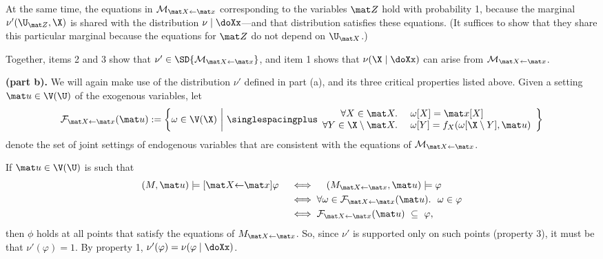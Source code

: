 \begin{subappendices}
\begin{lproof}
\begin{enumerate}
        At the same time, the equations in $\mathcal M_{\mat X{\gets} \mat x}$ corresponding to the variables $\mat Z$ hold with probability 1, because the marginal $\nu'(\U_{\mat Z}, \X)$ is shared with the distribution $\nu \mid \doXx$---and that distribution satisfies these equations. (It suffices to show that they share this particular marginal because the equations for $\mat Z$ do not depend on $\U_{\mat X}$.)
    \end{enumerate}
    Together, items 2 and 3 show that $\nu' \in \SD{\mathcal M_{\mat X{\gets} \mat x}}$, and item 1 shows that $\nu(\X \mid \doXx)$ can arise from $\mathcal M_{\mat X{\gets} \mat x}$. 


    \bigskip

    \textbf{(part b).}
    We will again make use of the distribution $\nu'$ defined in part (a), and its three critical properties listed above. 
    Given a setting $\mat u \in \V(\U)$ of the exogenous variables, let
    \[
        \mathcal F_{\mat X \gets \mat x} (\mat u) 
        := \left\{ \omega \in \V(\X) ~\middle|~
        {\singlespacingplus\begin{array}{rl}
            \forall X \in \mat X.~& \omega[X] = \mat x[X]\\
            \forall Y \in \X \setminus \mat X.~&\omega[Y] = f_X(\omega[\X \setminus Y], \mat u) 
        \end{array}}
        \right\} 
    \]
    denote the set of joint settings of endogenous variables that are consistent with the equations of $\mathcal M_{\mat X \gets \mat x}$. 

    If $\mat u \in \V(\U)$ is such that 
    \begin{align*}
        (M, \mat u) \models [\mat X {\gets} \mat x] \varphi
        \quad&\iff\quad
        (M_{\mat X {\gets} \mat x}, \mat u) \models \varphi  \\
        &\iff \forall \omega \in \mathcal F_{\mat X {\gets} \mat x}(\mat u).~~\omega \in \varphi \\
        &\iff 
            \mathcal F_{\mat X {\gets} \mat x}(\mat u)
                ~\subseteq~ \varphi, 
    \end{align*}
    then $\phi$ holds at all points that satisfy the equations of $M_{\mat X {\gets} \mat x}$. So, since $\nu'$ is supported only on such points (property 3), it must be that $\nu'(\varphi) = 1$. By property 1, 
    $\nu'(\varphi) =  \nu(\varphi \mid \doXx)$. 


\end{lproof}
\end{subappendices}
